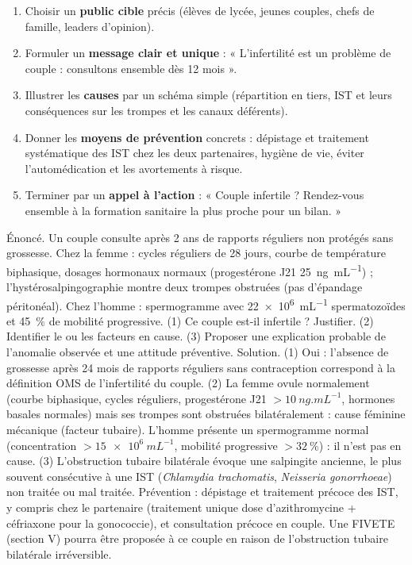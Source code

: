 \documentclass[11pt]{article}
\begin{document}
\begin{methode}
\begin{enumerate}
  \item Choisir un \textbf{public cible} précis (élèves de lycée, jeunes couples, chefs de famille, leaders d'opinion).
  \item Formuler un \textbf{message clair et unique} : « L'infertilité est un problème de couple : consultons ensemble dès 12 mois ».
  \item Illustrer les \textbf{causes} par un schéma simple (répartition en tiers, IST et leurs conséquences sur les trompes et les canaux déférents).
  \item Donner les \textbf{moyens de prévention} concrets : dépistage et traitement systématique des IST chez les deux partenaires, hygiène de vie, éviter l'automédication et les avortements à risque.
  \item Terminer par un \textbf{appel à l'action} : « Couple infertile ? Rendez-vous ensemble à la formation sanitaire la plus proche pour un bilan. »
\end{enumerate}
\end{methode}

\begin{exoresolu}
Énoncé. Un couple consulte après 2 ans de rapports réguliers non protégés sans grossesse. Chez la femme : cycles réguliers de 28 jours, courbe de température biphasique, dosages hormonaux normaux (progestérone J21 \SI{25}{ng.mL^{-1}}) ; l'hystérosalpingographie montre deux trompes obstruées (pas d'épandage péritonéal). Chez l'homme : spermogramme avec \SI{22e6}{mL^{-1}} spermatozoïdes et \SI{45}{\percent} de mobilité progressive. (1) Ce couple est-il infertile ? Justifier. (2) Identifier le ou les facteurs en cause. (3) Proposer une explication probable de l'anomalie observée et une attitude préventive.
\tcblower
Solution. (1) Oui : l'absence de grossesse après 24 mois de rapports réguliers sans contraception correspond à la définition OMS de l'infertilité du couple. (2) La femme ovule normalement (courbe biphasique, cycles réguliers, progestérone J21 $> \SI{10}{ng.mL^{-1}}$, hormones basales normales) mais ses trompes sont obstruées bilatéralement : cause féminine mécanique (facteur tubaire). L'homme présente un spermogramme normal (concentration $> \SI{15e6}{mL^{-1}}$, mobilité progressive $> \SI{32}{\percent}$) : il n'est pas en cause. (3) L'obstruction tubaire bilatérale évoque une salpingite ancienne, le plus souvent consécutive à une IST (\emph{Chlamydia trachomatis}, \emph{Neisseria gonorrhoeae}) non traitée ou mal traitée. Prévention : dépistage et traitement précoce des IST, y compris chez le partenaire (traitement unique dose d'azithromycine + céfriaxone pour la gonococcie), et consultation précoce en couple. Une FIVETE (section V) pourra être proposée à ce couple en raison de l'obstruction tubaire bilatérale irréversible.
\end{exoresolu}
\end{document}
